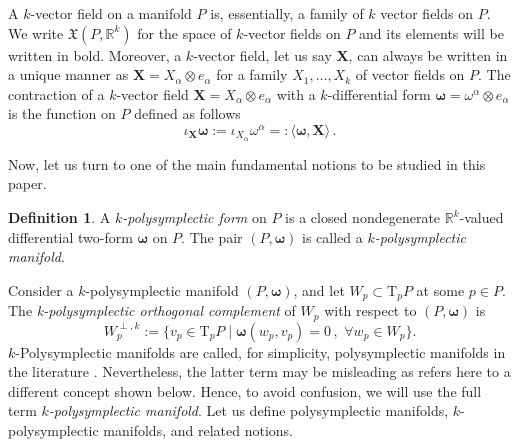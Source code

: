 \documentclass[11pt]{article}
\theoremstyle{plain}
\theoremstyle{definition}
\newtheorem{definition}[theorem]{Definition}
\newcommand{\T}{\mathrm{T}}
\numberwithin{equation}{section}
\begin{document}
A $k$-vector field on a manifold $P$ is, essentially, a family of $k$ vector fields on $P$. We write $\mathfrak{X}(P,\mathbb{R}^k)$ for the space of $k$-vector fields on $P$ and its elements will be written in bold. Moreover, a $k$-vector field, let us say ${\boldsymbol{X}}$, can always be written in a unique manner as ${\boldsymbol{X
}}=X_\alpha\otimes e_\alpha$ for a family $X_1,\ldots, X_k$ of vector fields on $P$. The contraction of a $k$-vector field ${\boldsymbol{X}}=X_\alpha\otimes e_\alpha$ with a $k$-differential form $\boldsymbol{\omega}=\omega^\alpha\otimes e_\alpha$ is the function on $P$ defined as follows
$$
\iota_{\boldsymbol{X}}\boldsymbol{\omega}:=\iota_{X_\alpha}\omega^\alpha=:\langle \boldsymbol{\omega},{\boldsymbol{X}}\rangle\,.
$$

Now, let us turn to one of the main fundamental notions to be studied in this paper.

\begin{definition}
A {\it $k$-polysymplectic form} on $P$ is a closed nondegenerate $\mathbb{R}^k$-valued differential two-form $\boldsymbol{\omega}$ on $P$. The pair $(P,\boldsymbol{\omega})$ is called a {\it $k$-polysymplectic manifold}.
\end{definition}
Consider a $k$-polysymplectic manifold $(P,\bm\omega)$, and let $W_p\subset\T_pP$ at some $p\in P$. The {\it k-polysymplectic orthogonal complement} of $W_p$ with respect to $(P,\bm\omega)$ is 
\[
W_p^{\perp,k} := \{v_p\in \T_p P\mid \bm\omega(w_p,v_p)=0\,,\,\, \forall w_p\in W_p\}.
\]
$k$-Polysymplectic manifolds are called, for simplicity, polysymplectic manifolds in the literature \cite{MRSV_15}. Nevertheless, the latter term may be misleading as refers here to a different concept shown below. Hence, to avoid confusion, we will use the full term \textit{$k$-polysymplectic manifold}. Let us define polysymplectic manifolds, $k$-polysymplectic manifolds, and related notions. 
\end{document}
